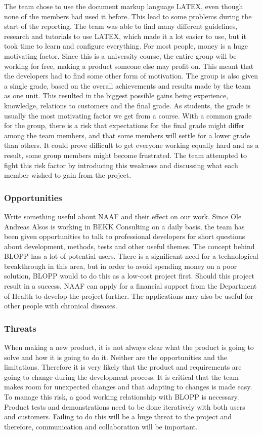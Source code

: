 The team chose to use the document markup language LATEX, even though none of the members 
had used it before. This lead to some problems during the start of the reporting. The team 
was able to find many different guidelines, research and tutorials to use LATEX, which made 
it a lot easier to use, but it took time to learn and configure everything. 
For most people, money is a huge motivating factor. Since this is a university course, 
the entire group will be working for free, making a product someone else may profit on. 
This meant that the developers had to find some other form of motivation. 
The group is also given a single grade, based on the overall achievements and results made 
by the team as one unit. This resulted in the biggest possible gains being experience, 
knowledge, relations to customers and the final grade. As students, the grade is usually the 
most motivating factor we get from a course. With a common grade for the group, there is a 
risk that expectations for the final grade might differ among the team members, and that 
some members will settle for a lower grade than others. It could prove difficult to get 
everyone working equally hard and as a result, some group members might become frustrated. 
The team attempted to fight this risk factor by introducing this weakness and discussing what 
each member wished to gain from the project.

\subsubsection{Opportunities}

Write something useful about NAAF and their effect on our work.
Since Ole Andreas Alsos is working in BEKK Consulting on a daily basis, the team has been 
given opportunities to talk to professional developers for short questions about development, 
methods, tests and other useful themes. 
The concept behind BLOPP has a lot of potential users. There is a significant need for a 
technological breakthrough in this area, but in order to avoid spending money on a poor solution, 
BLOPP would to do this as a low-cost project first. Should this project result in a success, 
NAAF can apply for a financial support from the Department of Health to develop the project 
further. The applications may also be useful for other people with chronical diseases.


\subsubsection{Threats}

When making a new product, it is not always clear what the product is going to solve and how it 
is going to do it. Neither are the opportunities and the limitations. Therefore it is very likely 
that the product and requirements are going to change during the development process. It is critical 
that the team makes room for unexpected changes and that adapting to changes is made easy. 
To manage this risk, a good working relationship with BLOPP is necessary. Product tests and 
demonstrations need to be done iteratively with both users and customers. Failing to do this will 
be a huge threat to the project and therefore, communication and collaboration will be important. 